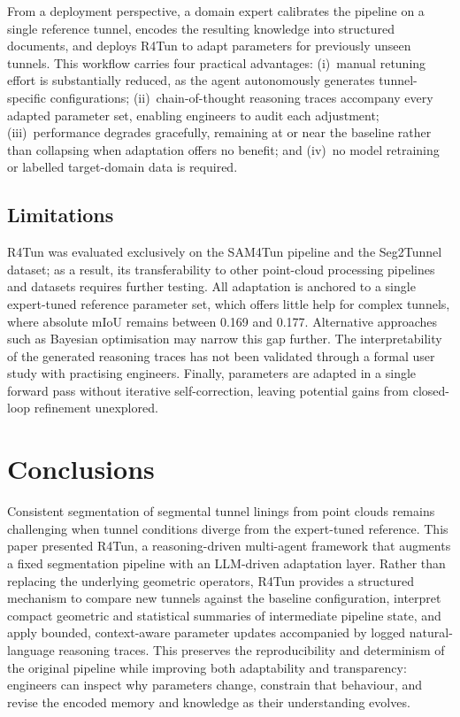 \documentclass[a4paper,fleqn]{cas-dc}
\begin{document}
From a deployment perspective, a domain expert calibrates the pipeline on a single reference tunnel, encodes the resulting knowledge into structured documents, and deploys R4Tun to adapt parameters for previously unseen tunnels. This workflow carries four practical advantages: (i)~manual retuning effort is substantially reduced, as the agent autonomously generates tunnel-specific configurations; (ii)~chain-of-thought reasoning traces accompany every adapted parameter set, enabling engineers to audit each adjustment; (iii)~performance degrades gracefully, remaining at or near the baseline rather than collapsing when adaptation offers no benefit; and (iv)~no model retraining or labelled target-domain data is required.

\subsection{Limitations}\label{sec:limitations}

R4Tun was evaluated exclusively on the SAM4Tun pipeline and the Seg2Tunnel dataset; as a result, its transferability to other point-cloud processing pipelines and datasets requires further testing. All adaptation is anchored to a single expert-tuned reference parameter set, which offers little help for complex tunnels, where absolute mIoU remains between 0.169 and 0.177. Alternative approaches such as Bayesian optimisation may narrow this gap further. The interpretability of the generated reasoning traces has not been validated through a formal user study with practising engineers. Finally, parameters are adapted in a single forward pass without iterative self-correction, leaving potential gains from closed-loop refinement unexplored.


\section{Conclusions}\label{sec:conclusions}

Consistent segmentation of segmental tunnel linings from point clouds remains challenging when tunnel conditions diverge from the expert-tuned reference. This paper presented R4Tun, a reasoning-driven multi-agent framework that augments a fixed segmentation pipeline with an LLM-driven adaptation layer. Rather than replacing the underlying geometric operators, R4Tun provides a structured mechanism to compare new tunnels against the baseline configuration, interpret compact geometric and statistical summaries of intermediate pipeline state, and apply bounded, context-aware parameter updates accompanied by logged natural-language reasoning traces. This preserves the reproducibility and determinism of the original pipeline while improving both adaptability and transparency: engineers can inspect why parameters change, constrain that behaviour, and revise the encoded memory and knowledge as their understanding evolves.
\end{document}
